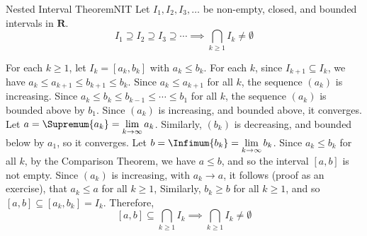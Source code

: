 \begin{Theorem}{Nested Interval Theorem}{NIT}
    Let $ I_1,I_2,I_3,\ldots $ be non-empty, closed, and bounded
    intervals in $ \mathbf{R} $.
    \[ I_1\supseteq I_2\supseteq I_3\supseteq\cdots
        \implies \bigcap_{k\ge 1}I_k\ne \emptyset \]
\end{Theorem}
\begin{Proof}{}{}
    For each $ k\ge 1 $, let $ I_k=[a_k,b_k] $ with $ a_k\le b_k $.
    For each $ k $, since $ I_{k+1}\subseteq I_k $, we have
    $ a_k\le a_{k+1}\le b_{k+1}\le b_k $. Since $ a_k\le a_{k+1} $ for all
    $ k $, the sequence $ (a_k) $ is increasing. Since
    $ a_k\le b_k\le b_{k-1}\le \cdots\le b_1 $ for all $ k $, the sequence
    $ (a_k) $ is bounded above by $ b_1 $. Since
    $ (a_k) $ is increasing, and bounded above, it converges.
    Let $ a=\Supremum{a_k}=\lim\limits_{{k} \to {\infty}} a_k $.
    Similarly, $ (b_k) $ is decreasing, and bounded below by $ a_1 $,
    so it converges. Let $ b=\Infimum{b_k}=\lim\limits_{{k} \to {\infty}} b_k $.
    Since $ a_k\le b_k $ for all $ k $, by the Comparison Theorem, we have
    $ a\le b $, and so the interval $ [a,b] $ is not empty. Since
    $ (a_k) $ is increasing, with $ a_k\to a $, it follows
    (proof as an exercise), that $ a_k\le a $ for all $ k\ge 1 $, Similarly,
    $ b_k\ge b $ for all $ k\ge 1 $, and so
    $ [a,b]\subseteq [a_k,b_k]=I_k $. Therefore,
    \[ [a,b]\subseteq
        \bigcap_{k\ge 1}I_k \implies
        \bigcap_{k\ge 1}I_k\ne \emptyset \]
\end{Proof}
